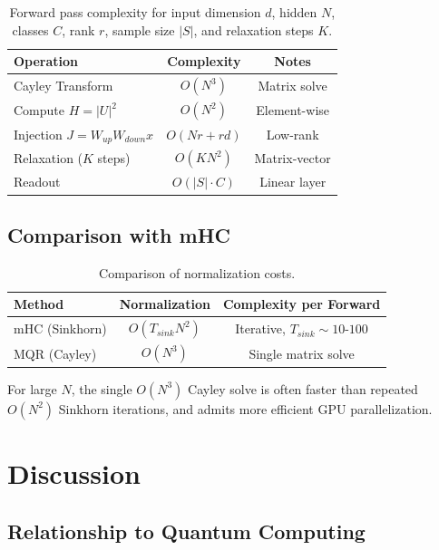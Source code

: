 \documentclass[11pt,a4paper]{article}
\begin{document}
\begin{table}[h]
\centering
\begin{tabular}{lcc}
\toprule
\textbf{Operation} & \textbf{Complexity} & \textbf{Notes} \\
\midrule
Cayley Transform & $O(N^3)$ & Matrix solve \\
Compute $H = |U|^2$ & $O(N^2)$ & Element-wise \\
Injection $J = W_{up}W_{down}x$ & $O(Nr + rd)$ & Low-rank \\
Relaxation ($K$ steps) & $O(KN^2)$ & Matrix-vector \\
Readout & $O(|S| \cdot C)$ & Linear layer \\
\bottomrule
\end{tabular}
\caption{Forward pass complexity for input dimension $d$, hidden $N$, classes $C$, rank $r$, sample size $|S|$, and relaxation steps $K$.}
\label{tab:complexity_forward}
\end{table}

\subsection{Comparison with mHC}

\begin{table}[h]
\centering
\begin{tabular}{lcc}
\toprule
\textbf{Method} & \textbf{Normalization} & \textbf{Complexity per Forward} \\
\midrule
mHC (Sinkhorn) & $O(T_{sink} N^2)$ & Iterative, $T_{sink} \sim 10$-$100$ \\
MQR (Cayley) & $O(N^3)$ & Single matrix solve \\
\bottomrule
\end{tabular}
\caption{Comparison of normalization costs.}
\label{tab:comparison}
\end{table}

For large $N$, the single $O(N^3)$ Cayley solve is often faster than repeated $O(N^2)$ Sinkhorn iterations, and admits more efficient GPU parallelization.

\section{Discussion}
\label{sec:discussion}

\subsection{Relationship to Quantum Computing}
\end{document}
